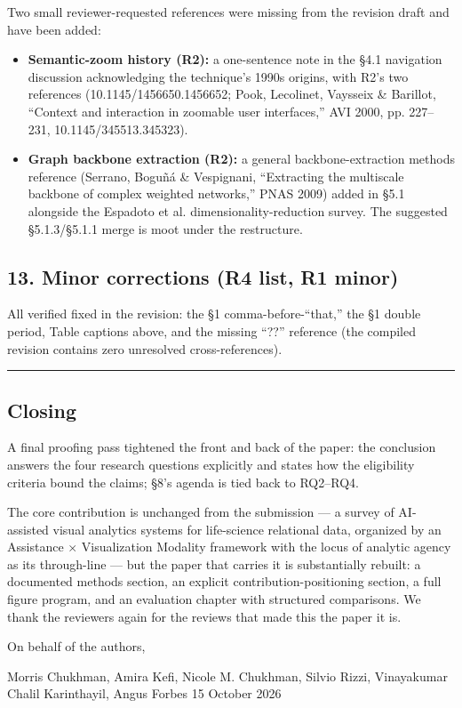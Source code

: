 \documentclass[11pt]{article}
\begin{document}
Two small reviewer-requested references were missing from the revision draft and have been added:
\begin{itemize}[leftmargin=*]
\item \textbf{Semantic-zoom history (R2):} a one-sentence note in the \S4.1 navigation discussion acknowledging the technique's 1990s origins, with R2's two references (10.1145/1456650.1456652; Pook, Lecolinet, Vaysseix \& Barillot, ``Context and interaction in zoomable user interfaces,'' AVI 2000, pp. 227--231, 10.1145/345513.345323).
\item \textbf{Graph backbone extraction (R2):} a general backbone-extraction methods reference (Serrano, Boguñá \& Vespignani, ``Extracting the multiscale backbone of complex weighted networks,'' PNAS 2009) added in \S5.1 alongside the Espadoto et al. dimensionality-reduction survey. The suggested \S5.1.3/\S5.1.1 merge is moot under the restructure.
\end{itemize}

\subsection*{13. Minor corrections (R4 list, R1 minor)}

All verified fixed in the revision: the \S1 comma-before-``that,'' the \S1 double period, Table captions above, and the missing ``??'' reference (the compiled revision contains zero unresolved cross-references).

\bigskip\hrule\bigskip

\subsection*{Closing}

A final proofing pass tightened the front and back of the paper:  the conclusion answers the four research questions explicitly and states how the eligibility criteria bound the claims; \S8's agenda is tied back to RQ2--RQ4.

The core contribution is unchanged from the submission — a survey of AI-assisted visual analytics systems for life-science relational data, organized by an Assistance $\times$ Visualization Modality framework with the locus of analytic agency as its through-line — but the paper that carries it is substantially rebuilt: a documented methods section, an explicit contribution-positioning section, a full figure program, and an evaluation chapter with structured comparisons. We thank the reviewers again for the reviews that made this the paper it is.

On behalf of the authors,

Morris Chukhman, Amira Kefi, Nicole M. Chukhman, Silvio Rizzi, Vinayakumar Chalil Karinthayil, Angus Forbes
15 October 2026
\end{document}
